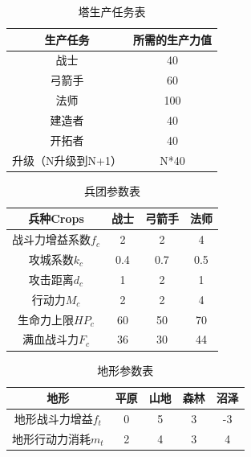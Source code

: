 \documentclass[a4paper,4pt]{article}
\begin{document}
\begin{table}[htbp]
	\centering
	\caption{塔生产任务表}
	\begin{tabular}{c|c}
		\hline
		生产任务           & 所需的生产力值 \bigstrut \\
		\hline
		战士               & 40 \bigstrut             \\
		\hline
		弓箭手             & 60 \bigstrut             \\
		\hline
		法师               & 100 \bigstrut            \\
		\hline
		建造者             & 40 \bigstrut             \\
		\hline
		开拓者             & 40 \bigstrut             \\
		\hline
		升级（N升级到N+1） & N*40 \bigstrut           \\
		\hline
	\end{tabular}%
	\label{塔生产}%
\end{table}%

\begin{table}[htbp]
	\centering
	\caption{兵团参数表}
	\begin{tabular}{c|c|c|c}
		\hline
		兵种Crops           & 战士 & 弓箭手 & 法师 \bigstrut \\
		\hline
		战斗力增益系数$f_c$ & 2    & 2      & 4 \bigstrut    \\
		\hline
		攻城系数$k_c$       & 0.4  & 0.7    & 0.5 \bigstrut  \\
		\hline
		攻击距离$d_c$       & 1    & 2      & 1 \bigstrut    \\
		\hline
		行动力$M_c$         & 2    & 2      & 4 \bigstrut    \\
		\hline
		生命力上限$HP_c$    & 60   & 50     & 70 \bigstrut   \\
		\hline
		满血战斗力$F_c$     & 36   & 30     & 44 \bigstrut   \\
		\hline
	\end{tabular}%
	\label{兵团}%
\end{table}%

\begin{table}[htbp]
	\centering
	\caption{地形参数表}
	\begin{tabular}{c|c|c|c|c|}
		\hline
		地形                & 平原 & 山地 & 森林 & 沼泽 \bigstrut \\
		\hline
		地形战斗力增益$f_t$ & 0    & 5    & 3    & -3 \bigstrut   \\
		\hline
		地形行动力消耗$m_t$ & 2    & 4    & 3    & 4 \bigstrut    \\
		\hline
	\end{tabular}%
	\label{地形}%
\end{table}%
\end{document}
